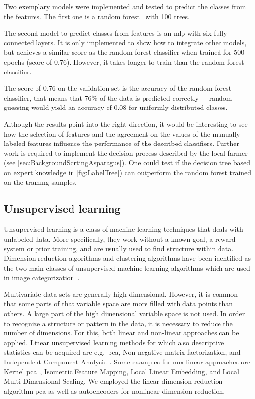 \bigskip
Two exemplary models were implemented and tested to predict the classes from the features. The first one is a random forest~\citep{breiman2001random} with 100 trees.

The second model to predict classes from features is an \acrshort{mlp} with six fully connected layers. It is only implemented to show how to integrate other models, but achieves a similar score as the random forest classifier when trained for 500 epochs (score of 0.76). However, it takes longer to train than the random forest classifier.

The score of 0.76 on the validation set is the accuracy of the random forest classifier, that means that 76\% of the data is predicted correctly –- random guessing would yield an accuracy of 0.08 for uniformly distributed classes.

\bigskip
Although the results point into the right direction, it would be interesting to see how the selection of features and the agreement on the values of the manually labeled features influence the performance of the described classifiers. Further work is required to implement the decision process described by the local farmer (see \autoref{sec:BackgroundSortingAsparagus}). One could test if the decision tree based on expert knowledge in \autoref{fig:LabelTree}) can outperform the random forest trained on the training samples.


\subsection{Unsupervised learning}
\label{sec:UnsupervisedLearning}

Unsupervised learning is a class of machine learning techniques that deals with unlabeled data. More specifically, they work without a known goal, a reward system or prior training, and are usually used to find structure within data. Dimension reduction algorithms and clustering algorithms have been identified as the two main classes of unsupervised machine learning algorithms which are used in image categorization~\citep{olaode2014}. 

\bigskip
Multivariate data sets are generally high dimensional. However, it is common that some parts of that variable space are more filled with data points than others. A large part of the high dimensional variable space is not used. In order to recognize a structure or pattern in the data, it is necessary to reduce the number of dimensions. For this, both linear and non-linear approaches can be applied. Linear unsupervised learning methods for which also descriptive statistics can be acquired are e.g.\ \acrfull{pca}, Non-negative matrix factorization, and Independent Component Analysis~\citep{olaode2014}. Some examples for non-linear approaches are Kernel \acrshort{pca}~\citep{olivier2006semi}, Isometric Feature Mapping,  Local Linear Embedding, and Local Multi-Dimensional Scaling. We employed the linear dimension reduction algorithm \acrshort{pca} as well as autoencoders for nonlinear dimension reduction.


